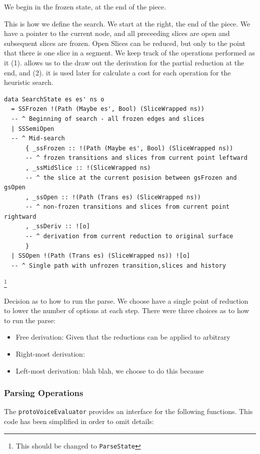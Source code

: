\documentclass[12pt,a4paper,twoside,openright]{report}
\theoremstyle{definition}
\begin{document}
We begin in the frozen state, at the end of the piece.

This is how we define the search. We start at the right, the end of the piece. We have a pointer to the current node, and all preceeding slices are open and subsequent slices are frozen. Open Slices can be reduced, but only to the point that there is one slice in a segment. We keep track of the operations performed as it (1). allows us to the draw out the derivation for the partial reduction at the end, and (2). it is used later for calculate a cost for each operation for the heuristic search.



\begin{lstlisting}[caption={protovoiceEvaluator}, captionpos=b]
data SearchState es es' ns o
  = SSFrozen !(Path (Maybe es', Bool) (SliceWrapped ns)) 
  -- ^ Beginning of search - all frozen edges and slices
  | SSSemiOpen 
  -- ^ Mid-search
      { _ssFrozen :: !(Path (Maybe es', Bool) (SliceWrapped ns))
      -- ^ frozen transitions and slices from current point leftward
      , _ssMidSlice :: !(SliceWrapped ns)
      -- ^ the slice at the current posision between gsFrozen and gsOpen
      , _ssOpen :: !(Path (Trans es) (SliceWrapped ns))
      -- ^ non-frozen transitions and slices from current point rightward
      , _ssDeriv :: ![o]
      -- ^ derivation from current reduction to original surface
      }
  | SSOpen !(Path (Trans es) (SliceWrapped ns)) ![o] 
  -- ^ Single path with unfrozen transition,slices and history
\end{lstlisting}
\footnote{This should be changed to \texttt{ParseState}}

Decision as to how to run the parse. We choose have a single point of reduction to lower the number of options at each step.
There were three choices as to how to run the parse:
\begin{itemize}
  \item Free derivation: Given that the reductions can be applied to arbitrary 
  \item Right-most derivation:  
  \item Left-most derivation: blah blah, we choose to do this because 
\end{itemize}


\subsubsection{Parsing Operations}
The \texttt{protoVoiceEvaluator} \cite{finkensiepModelingInferringProtovoice2021} provides an interface for the following functions. This code has been simplified in order to omit details:
\end{document}
